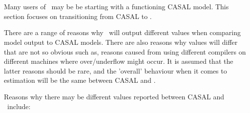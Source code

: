 \section{\label{sec:setupCasal2}}

Many users of \CNAME\ may be be starting with a functioning CASAL model. This section focuses on transitioning from CASAL to \CNAME. 

There are a range of reasons why \CNAME\ will output different values when comparing model output to CASAL models. There are also reasons why values will differ that are not so obvious such as, reasons caused from using different compilers on different machines where over/underflow might occur. It is assumed that the latter reasons  should be rare, and the 'overall' behaviour when it comes to estimation will be the same between CASAL and \CNAME.

Reasons why there may be different values reported between CASAL and \CNAME\ include:

